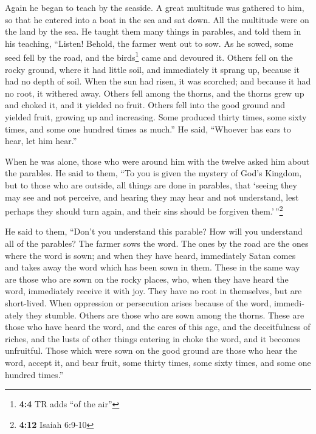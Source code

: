 \begin{paracol}{2}
\begin{otherlanguage}{english}
 Again he began to teach by the seaside. A great multitude
was gathered to him, so that he entered into a boat in the sea and sat
down. All the multitude were on the land by the sea.  He
taught them many things in parables, and told them in his teaching,
 ``Listen! Behold, the farmer went out to sow.
 As he sowed, some seed fell by the road, and the
birds\footnote{\textbf{4:4} TR adds ``of the air''} came and devoured
it.  Others fell on the rocky ground, where it had little
soil, and immediately it sprang up, because it had no depth of soil.
 When the sun had risen, it was scorched; and because it
had no root, it withered away.  Others fell among the
thorns, and the thorns grew up and choked it, and it yielded no fruit.
 Others fell into the good ground and yielded fruit,
growing up and increasing. Some produced thirty times, some sixty times,
and some one hundred times as much.''  He said, ``Whoever
has ears to hear, let him hear.''

 When he was alone, those who were around him with the
twelve asked him about the parables.  He said to them,
``To you is given the mystery of God's Kingdom, but to those who are
outside, all things are done in parables,  that `seeing
they may see and not perceive, and hearing they may hear and not
understand, lest perhaps they should turn again, and their sins should
be forgiven them.'\,''\footnote{\textbf{4:12} Isaiah 6:9-10}

 He said to them, ``Don't you understand this parable?
How will you understand all of the parables?  The farmer
sows the word.  The ones by the road are the ones where
the word is sown; and when they have heard, immediately Satan comes and
takes away the word which has been sown in them.  These
in the same way are those who are sown on the rocky places, who, when
they have heard the word, immediately receive it with joy.
 They have no root in themselves, but are short-lived.
When oppression or persecution arises because of the word, immediately
they stumble.  Others are those who are sown among the
thorns. These are those who have heard the word,  and the
cares of this age, and the deceitfulness of riches, and the lusts of
other things entering in choke the word, and it becomes unfruitful.
 Those which were sown on the good ground are those who
hear the word, accept it, and bear fruit, some thirty times, some sixty
times, and some one hundred times.''


\end{otherlanguage}
\end{paracol}
